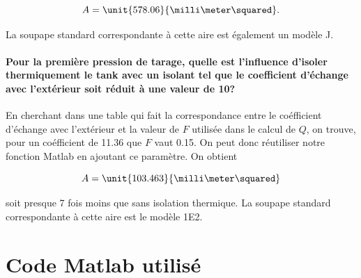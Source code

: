 $$A = \unit{578.06}{\milli\meter\squared}.$$

La soupape standard correspondante à cette aire est également
un modèle J\cite{mignon}.

\paragraph{Pour la première pression de tarage, quelle est l'influence
d'isoler thermiquement le tank avec un isolant tel que le coefficient
d'échange avec l'extérieur soit réduit à une valeur de
\unit{10}{\watt\per\meter\squared\kelvin}?}
En cherchant dans une table qui fait la correspondance 
entre le coéfficient d'échange avec l'extérieur et la valeur
de $F$ utilisée dans le calcul de $Q$, on trouve, pour un
coéfficient de 11.36 que $F$ vaut 0.15. On peut donc
réutiliser notre fonction Matlab en ajoutant ce paramètre.
On obtient 

$$A = \unit{103.463}{\milli\meter\squared}$$

soit presque 7 fois moins que sans isolation thermique.
La soupape standard correspondante à cette aire est le modèle
1E2.

\appendix
\section{Code Matlab utilisé}
\label{code-matlab}


